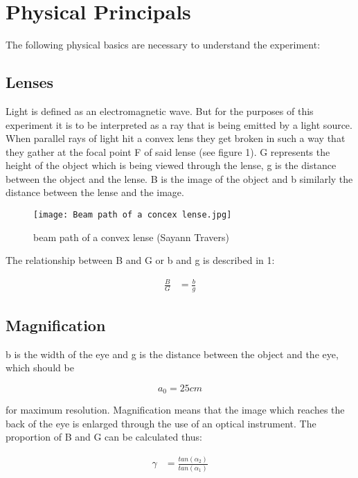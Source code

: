 \section{Physical Principals}

The following physical basics are necessary to understand the experiment:

\subsection{Lenses}

Light is defined as an electromagnetic wave. But for the purposes of this experiment it is to be interpreted as a ray 
that is being emitted by a light source. When parallel rays of light hit a convex lens they get broken 
in such a way that they gather at the focal point F of said lense (see figure 1). G represents the height of the object which is being 
viewed through the lense, g is the distance between the object and the lense. B is the image of the object and b similarly the distance between 
the lense and the image. 

\begin{figure}[h!]
    \centering
  \texttt{[image: Beam path of a concex lense.jpg]}
  \caption{beam path of a convex lense (Sayann Travers)}
  \end{figure}

The relationship between B and G or b and g is described in 1:

\begin{align*}
    \frac{B}{G} & = \frac{b}{g} \tag{1}
\end{align*}

\subsection{Magnification}

b is the width of the eye and g is the distance between the object and the eye, which should be 

\begin{equation}
  a_{0} = 25 cm \tag{2} 
\end{equation}

for maximum resolution. Magnification means that the image which reaches the back of the eye is enlarged through the use 
of an optical instrument. The proportion of B and G can be calculated thus:

\begin{align*}
    \gamma & = \frac{tan(\alpha_{2})}{tan(\alpha_{1})} \tag{3}
\end{align*}

